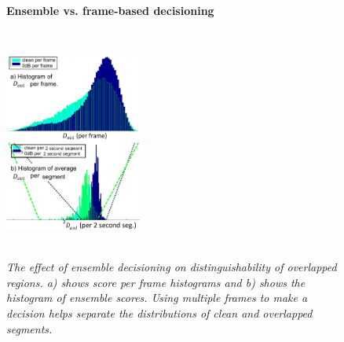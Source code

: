 {\begin{figure}[h!]
	\centering
	\vspace{0mm}
	\textbf{Ensemble vs. frame-based decisioning}\par\medskip	
	\includegraphics[height = 3in, width=0.4\textwidth]{figures/compare_pframe_pseg_hists}
	\vspace{-1mm}
	\caption{\it The effect of ensemble decisioning on distinguishability of overlapped regions. a) shows score per frame histograms and b) shows the histogram of ensemble scores. Using multiple frames to make a decision helps separate the distributions of clean and overlapped segments.}
	\vspace{-2mm}
	\label{fig:compare_perframe_and_perfile_ovldethist}
\end{figure}

}
